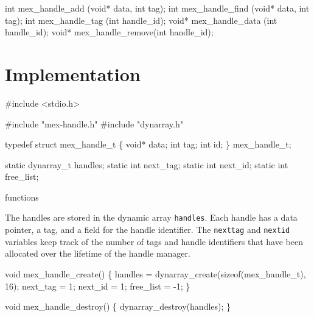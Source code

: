 \nwenddocs{}\plusendmoddef
int   mex_handle_add   (void* data, int tag);
int   mex_handle_find  (void* data, int tag);
int   mex_handle_tag   (int handle_id);
void* mex_handle_data  (int handle_id);
void* mex_handle_remove(int handle_id);

\nwendcode{}\nwdocspar

\section{Implementation}

\nwenddocs{}\endmoddef
#include <stdio.h>

#include "mex-handle.h"
#include "dynarray.h"

typedef struct mex_handle_t \{
    void* data;
    int   tag;
    int   id;
\} mex_handle_t;

static dynarray_t handles;
static int next_tag;
static int next_id;
static int free_list;

\LA{}functions~{\nwtagstyle{}}\RA{}
\nwendcode{}\nwdocspar

The handles are stored in the dynamic array {\tt{}handles}.  Each handle
has a data pointer, a tag, and a field for the handle identifier.
The {\tt{}next{}tag} and {\tt{}next{}id} variables keep track of the number
of tags and handle identifiers that have been allocated over the lifetime
of the handle manager.

\nwenddocs{}\endmoddef
void mex_handle_create()
\{
    handles   = dynarray_create(sizeof(mex_handle_t), 16);
    next_tag  = 1;
    next_id   = 1;
    free_list = -1;
\}

void mex_handle_destroy()
\{
    dynarray_destroy(handles);
\}

\nwendcode{}\nwdocspar

